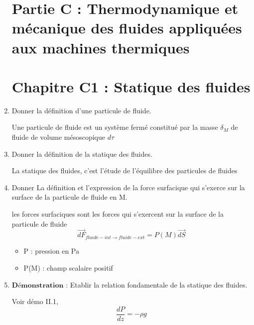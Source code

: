 \documentclass{article}
\begin{document}
\begin{enumerate}[label=\arabic{enumi} - , left=0pt, itemsep=1em]
\section*{\centering\huge Partie C : Thermodynamique et mécanique des fluides appliquées aux machines thermiques}

\section*{\centering Chapitre C1 : Statique des fluides}
    \item Donner la définition d'une particule de fluide. \par
    \begin{solution}
     Une particule de fluide est un système fermé constitué par la masse $\delta_M$ de fluide de volume mésoscopique $d\tau$
    \end{solution}

    \item Donner la définition de la statique des fluides. \par
    \begin{solution}
     La statique des fluides, c'est l'étude de l'équilibre des particules de fluides 
    \end{solution}

    \item Donner La définition et l'expression de la force surfacique qui s'exerce sur la surface de la particule de fluide en M. \par
    \begin{solution}
     les forces surfaciques sont les forces qui s'exercent sur la surface de la particule de fluide
          \[ \overrightarrow{dF}_{fluide-int \to fluide-ext} = P(M) \vec{dS}\]
         
          \begin{itemize}
               \tiny\item   P : pression en Pa
               \tiny\item   P(M) : champ scalaire positif
           \end{itemize}  
     \end{solution}

     \item $\textbf{Démonstration :}$ Etablir la relation fondamentale de la statique des fluides.\par
           \begin{solution}
               Voir démo II.1, \[ \frac{dP}{dz}=-\rho g \]
       

\end{solution}
\end{enumerate}
\end{document}
